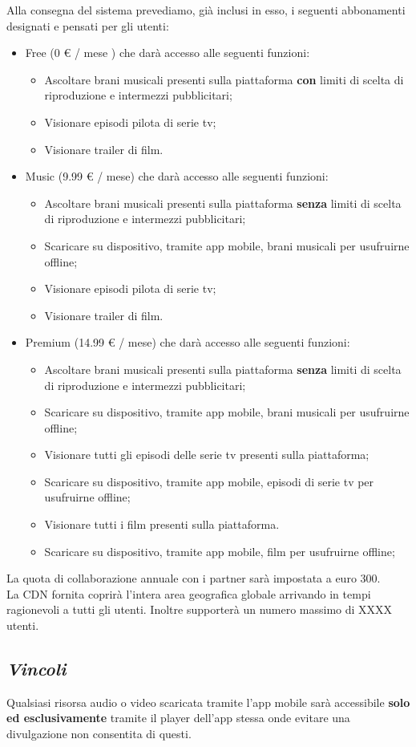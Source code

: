 Alla consegna del sistema prevediamo, già inclusi in esso, i seguenti abbonamenti designati e pensati per gli utenti:
\begin{itemize}
    \item Free (0 € / mese ) che darà accesso alle seguenti funzioni: 
	\begin{itemize}
   		\item Ascoltare brani musicali presenti sulla piattaforma \textbf{con} limiti di scelta di riproduzione e intermezzi pubblicitari;
		\item Visionare episodi pilota di serie tv;
		\item Visionare trailer di film.
	\end{itemize}
    \item Music (9.99 € / mese) che darà accesso alle seguenti funzioni:
	\begin{itemize}
   		\item Ascoltare brani musicali presenti sulla piattaforma \textbf{senza} limiti di scelta di riproduzione e intermezzi pubblicitari;
		\item Scaricare su dispositivo, tramite app mobile, brani musicali per usufruirne offline;
		\item Visionare episodi pilota di serie tv;
		\item Visionare trailer di film.
	\end{itemize}
    \item Premium (14.99 € / mese) che darà accesso alle seguenti funzioni:
	\begin{itemize}
   		\item Ascoltare brani musicali presenti sulla piattaforma \textbf{senza} limiti di scelta di riproduzione e intermezzi pubblicitari;
		\item Scaricare su dispositivo, tramite app mobile, brani musicali per usufruirne offline;
		\item Visionare tutti gli episodi delle serie tv presenti sulla piattaforma;
		\item Scaricare su dispositivo, tramite app mobile, episodi di serie tv per usufruirne offline;
		\item Visionare tutti i film presenti sulla piattaforma.
		\item Scaricare su dispositivo, tramite app mobile, film per usufruirne offline;
	\end{itemize}
\end{itemize}

La quota di collaborazione annuale con i partner sarà impostata a euro 300.\\

La CDN fornita coprirà l’intera area geografica globale arrivando in tempi ragionevoli a tutti gli utenti. Inoltre supporterà un numero massimo di XXXX utenti.

\subsection{\itshape{Vincoli}}
Qualsiasi risorsa audio o video scaricata tramite l'app mobile sarà accessibile \textbf{solo ed esclusivamente} tramite il player dell'app stessa onde evitare una divulgazione non consentita di questi.
